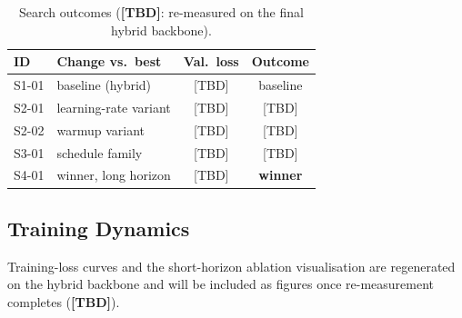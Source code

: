 \begin{table}[htbp]
\centering
\caption{Search outcomes (\textbf{[TBD]}: re-measured on the final hybrid backbone).}
\label{tab:configs}
\begin{tabular}{llcc}
\toprule
\textbf{ID} & \textbf{Change vs.\ best} & \textbf{Val.\ loss} & \textbf{Outcome} \\
\midrule
S1-01 & baseline (hybrid) & [TBD] & baseline \\
S2-01 & learning-rate variant & [TBD] & [TBD] \\
S2-02 & warmup variant & [TBD] & [TBD] \\
S3-01 & schedule family & [TBD] & [TBD] \\
S4-01 & winner, long horizon & [TBD] & \textbf{winner} \\
\bottomrule
\end{tabular}
\end{table}

\subsection{Training Dynamics}
Training-loss curves and the short-horizon ablation visualisation are regenerated on the hybrid backbone and will be included as figures once re-measurement completes (\textbf{[TBD]}).